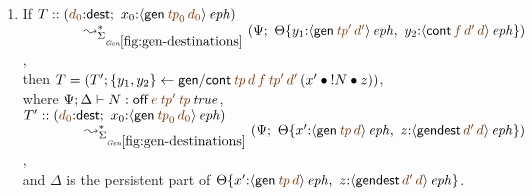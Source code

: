 \begin{lemma}
\begin{enumerate}
\medskip
\item If 
   $T :: (\lf{d_0}{:}{\sf dest}; ~
            x_0{:}\iseph{\susp{{\sf gen}\,\lf{{\it tp}_0}\,\lf{d_0}}})$
\\
   $~\qquad \qquad \leadsto^*_{\siggendests}
         (\Psi; ~
          \tackon{\Theta}
           {y_1{:}\iseph{\susp{{\sf gen}\,\lf{{\it tp}'}\,\lf{d'}}}, ~
            y_2{:}\iseph{\susp{{\sf cont}\,\lf{f}\,\lf{d'}\,\lf{d}}}})$,
\smallskip
\\ then 
   $T = \left(T';
       \trstep{y_1, y_2}{{\sf gen/cont}
       \,\lf{{\it tp}}\,\lf{d}\,\lf{f}\,\lf{{\it tp}'}\,\lf{d'}
       \,(\tfuser{x'}{\tfuser{\tbangr{N}}{z}})}\right)$,
\\ where
   $\Psi; \Delta \vdash N : \isconc{{\sf off}\,\lf{e}\,\lf{{\it tp}'}\,\lf{{\it tp}}}$,
\\ $T' :: (\lf{d_0}{:}{\sf dest}; ~
            x_0{:}\iseph{\susp{{\sf gen}\,\lf{{\it tp}_0}\,\lf{d_0}}})$
\\ $~\qquad\qquad        \leadsto^*_{\siggendests}
         (\Psi; ~
          \tackon{\Theta}
           {x'{:}\iseph{\susp{{\sf gen}\,\lf{{\it tp}}\,\lf{d}}}, ~
            z{:}\iseph{\susp{{\sf gendest}\,\lf{d'}\,\lf{d}}}})$,
\smallskip
\\ and $\Delta$ is the persistent part of 
   $\tackon{\Theta}
           {x'{:}\iseph{\susp{{\sf gen}\,\lf{{\it tp}}\,\lf{d}}}, ~
            z{:}\iseph{\susp{{\sf gendest}\,\lf{d'}\,\lf{d}}}}$.





\medskip
\end{enumerate}
\end{lemma}

